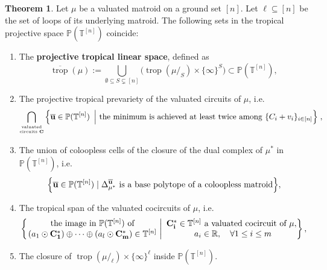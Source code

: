 \documentclass[11pt]{amsart}
\newcommand{\RR}{\mathbb R}
\newcommand{\PP}{\mathbb P}
\newcommand{\TT}{\mathbb T}
\newcommand{\trop}{\operatorname{trop}}
\newcommand{\bb}{\mathcal B}
\newcommand{\bu}{{\mathbf u}}
\theoremstyle{definition}
\newtheorem{maintheorem}{Theorem}
\begin{document}
\begin{maintheorem}\label{thm:main2}
Let $\mu$ be a valuated matroid on a ground set $[n]$.  Let $\ell\subseteq [n]$ be the set of loops of its underlying matroid.  The following sets in the tropical projective space $\PP(\TT^{[n]})$ coincide:
\begin{enumerate}[label=(\roman*)]
\item \label{thm2:pt1} The \textbf{projective tropical linear space}, defined as
\[
\overline{\trop}(\mu) := \displaystyle \bigcup_{\emptyset\subseteq S \subsetneq [n]} \Big( \trop(\mu/_S)\times \{\infty\}^S \Big) \subset \PP(\TT^{[n]}),
\]

\item \label{thm2:pt2}The projective tropical prevariety of the valuated circuits of $\mu$, i.e.\
\[
\bigcap_{\tiny \begin{matrix} \textnormal{valuated}\\ \textnormal{circuits $\mathbf C$}\end{matrix}} \Big\{ \overline\bu \in \PP(\TT^{[n]}) \ \left| \ \textnormal{the minimum is achieved at least twice among } \{C_i + v_i\}_{i\in [n]}\Big\}\right.,
\]

\item \label{thm2:pt3} The union of coloopless cells of the closure of the dual complex of $\mu^*$ in $\PP(\TT^{[n]})$, i.e.\
\[
\begin{split}
\Big\{\overline\bu\in \PP(\TT^{[n]}) \mid \Delta_{\mu^*}^{\overline\bu} \textnormal{ is a base polytope of a coloopless matroid}\Big\},
\end{split}
\]

\item \label{thm2:pt4} The tropical span of the valuated cocircuits of $\mu$, i.e.\
\[
\left\{\left. \begin{matrix} \textnormal{the image in $\PP(\TT^{[n]})$ of} \\
(a_1\odot \mathbf{C_1^*}) \oplus \cdots \oplus (a_l \odot \mathbf{C_m^*}) \in \TT^{[n]}
\end{matrix}
\ \right|\  \begin{matrix}
\mathbf{C_i^*}\in \TT^{[n]} \textnormal{ a valuated cocircuit of } \mu,\\
\ a_i \in \RR, \quad \forall 1\leq i \leq m
\end{matrix}
\right\},
\]

\item \label{thm2:pt5}The closure of $\trop(\mu/_\ell) \times \{\infty\}^\ell$ inside $\PP(\TT^{[n]})$.
\end{enumerate}
\end{maintheorem}
\end{document}
